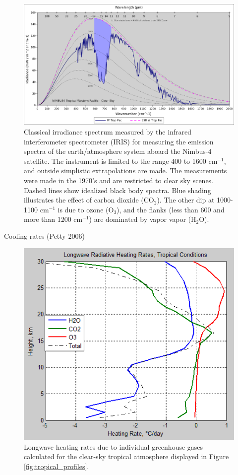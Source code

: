 \documentclass[12pt]{book}
\begin{document}
\begin{figure}
\begin{center}
\includegraphics[width=17 cm]{../external_figures/GW_Petty_IRIS_Tropical_Western_Pacific.png}
\end{center}
\caption{ Classical irradiance spectrum measured by the infrared interferometer spectrometer (IRIS) for measuring the emission spectra of the earth/atmosphere system aboard the Nimbus-4 satellite. The instrument is limited to the range 400 to 1600 cm$^{-1}$, and outside simplistic extrapolations are made. The measurements were made in the 1970's and are restricted to clear sky scenes. Dashed lines show idealized black body spectra. Blue shading illustrates the effect of carbon dioxide (CO$_2$). The other dip at 1000-1100 cm$^{-1}$ is due to ozone (O$_3$), and the flanks (less than 600 and more than 1200 cm$^{-1}$) are dominated by vapor vapor (H$_2$O). } 
\label{fig:radiation_spectrum}
\end{figure}

Cooling rates (Petty 2006)

\begin{figure}
\begin{center}
\includegraphics[width=8 cm]{../external_figures/atmospheric-radiation-13c-heating-rates-tropical-each-h2o-co2-o3.png}
\end{center}
\caption{ Longwave heating rates due to individual greenhouse gases calculated for the  clear-sky tropical atmosphere displayed in Figure \ref{fig:tropical_profiles}.  } 
\label{fig:radiative_cooling}
\end{figure}
\end{document}
